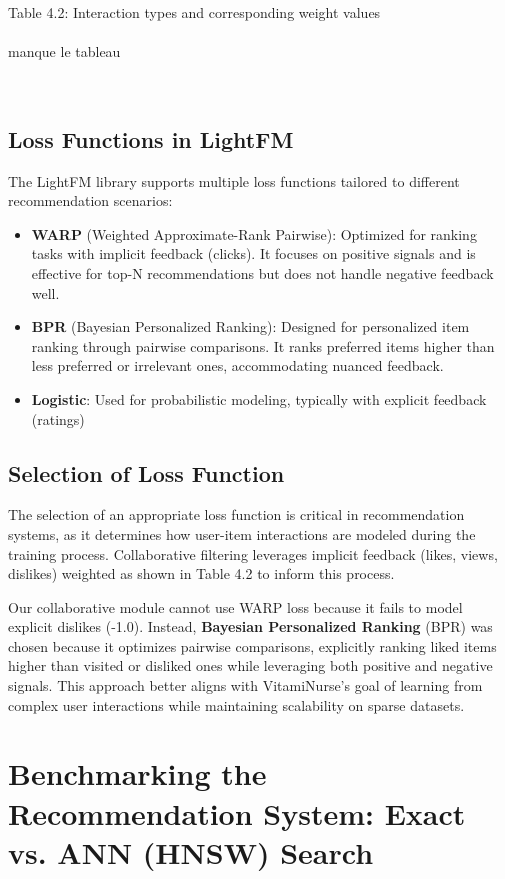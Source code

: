 Table 4.2: Interaction types and corresponding weight values
\\
\\
manque le tableau


\\

\subsection{Loss Functions in LightFM}
The LightFM library supports multiple loss functions tailored to different
recommendation scenarios:
\begin{itemize}
\item \textbf{WARP} (Weighted Approximate-Rank Pairwise): Optimized for
ranking tasks with implicit feedback (clicks). It focuses on positive signals and is effective for top-N recommendations but does not
handle negative feedback well.
\item \textbf{BPR} (Bayesian Personalized Ranking): Designed for personalized
item ranking through pairwise comparisons. It ranks preferred items
higher than less preferred or irrelevant ones, accommodating nuanced
feedback.
\item \textbf{Logistic}: Used for probabilistic modeling, typically with explicit
feedback (ratings)
\end{itemize}

\subsection{ Selection of Loss Function}
The selection of an appropriate loss function is critical in recommendation
systems, as it determines how user-item interactions are modeled during
the training process. Collaborative filtering leverages implicit feedback
(likes, views, dislikes) weighted as shown in Table 4.2 to inform this
process.

Our collaborative module cannot use WARP loss because it fails to model
explicit dislikes (-1.0). Instead, \textbf{Bayesian Personalized Ranking}
(BPR) was chosen because it optimizes pairwise comparisons, explicitly
ranking liked items higher than visited or disliked ones while leveraging
both positive and negative signals. This approach better aligns with
VitamiNurse’s goal of learning from complex user interactions while
maintaining scalability on sparse datasets.

\section{Benchmarking the Recommendation System:
Exact vs. ANN (HNSW) Search}

